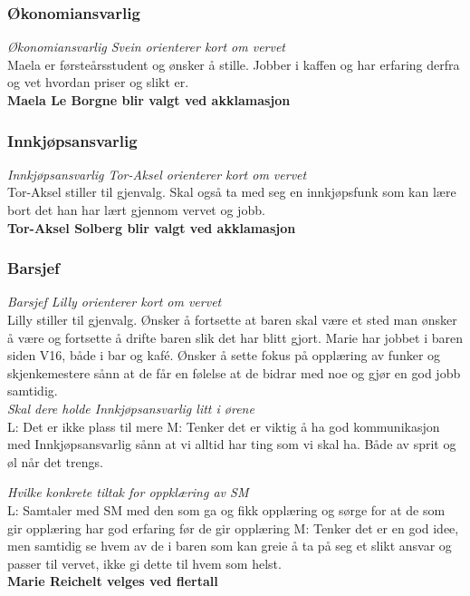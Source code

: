 \documentclass[10pt,norsk,a4paper]{article}
\begin{document}
\begin{multicols}{2}
\subsubsection{Økonomiansvarlig}
\textit{Økonomiansvarlig Svein orienterer kort om vervet}\\
Maela er førsteårsstudent og ønsker å stille. Jobber i kaffen og har erfaring
derfra og vet hvordan priser og slikt er. \\
\textbf{Maela Le Borgne blir valgt ved akklamasjon}
\subsubsection{Innkjøpsansvarlig}
\textit{Innkjøpsansvarlig Tor-Aksel orienterer kort om vervet}\\
Tor-Aksel stiller til gjenvalg. Skal også ta med seg en innkjøpsfunk som kan
lære bort det han har lært gjennom vervet og jobb.\\
\textbf{Tor-Aksel Solberg blir valgt ved akklamasjon}
\subsubsection{Barsjef}
\textit{Barsjef Lilly orienterer kort om vervet}\\
Lilly stiller til gjenvalg. Ønsker å fortsette at baren skal være et
sted man ønsker å være og fortsette å drifte baren slik det har blitt gjort.
Marie har jobbet i baren siden V16, både i bar og kafé. Ønsker å
sette fokus på opplæring av funker og skjenkemestere sånn at de får en følelse
at de bidrar med noe og gjør en god jobb samtidig.\\
\textit{Skal dere holde Innkjøpsansvarlig litt i ørene}\\
L: Det er ikke plass til mere
M: Tenker det er viktig å ha god kommunikasjon med Innkjøpsansvarlig sånn at
vi alltid har ting som vi skal ha. Både av sprit og øl når det trengs.

\textit{Hvilke konkrete tiltak for oppklæring av SM}\\
L: Samtaler med SM med den som ga og fikk opplæring og sørge for at de som gir
opplæring har god erfaring før de gir opplæring
M: Tenker det er en god idee, men samtidig se hvem av de i baren som kan greie
å ta på seg et slikt ansvar og passer til vervet, ikke gi dette til hvem som
helst.\\
\textbf{Marie Reichelt velges ved flertall}


\end{multicols}
\end{document}
